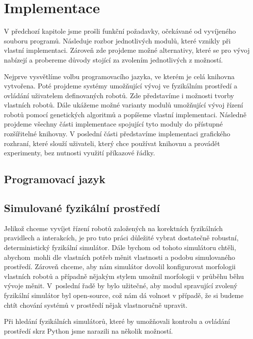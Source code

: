 
\chapter{Implementace}
V předchozí kapitole jsme prošli funkční požadavky, očekávané od vyvíjeného
souboru programů. Následuje rozbor jednotlivých modulů, které vznikly při
vlastní implementaci. Zároveň zde projdeme možné alternativy, které se pro
vývoj nabízejí a probereme důvody stojící za zvolením jednotlivých z možností.

Nejprve vysvětlíme volbu programovacího jazyka, ve kterém je celá knihovna
vytvořena. Poté projdeme systémy umožňující vývoj ve fyzikálním prostředí a
ovládání uživatelem definovaných robotů. Zde představíme i možnosti tvorby
vlastních robotů. Dále ukážeme možné varianty modulů umožňující vývoj řízení
robotů pomocí genetických algoritmů a popíšeme vlastní implementaci. Následně
projdeme všechny části implementace spojující tyto moduly do přístupné
rozšířitelné knihovny. V poslední části představíme implementaci grafického
rozhraní, které slouží uživateli, který chce používat knihovnu a provádět
experimenty, bez nutnosti využití příkazové řádky.

\section{Programovací jazyk}


\section{Simulované fyzikální prostředí}

Jelikož chceme vyvíjet řízení robotů založených na korektních fyzikálních
pravidlech a interakcích, je pro tuto práci důležité vybrat dostatečně
robustní, deterministický fyzikální simulátor. Dále bychom od tohoto simulátoru
chtěli, abychom~mohli dle vlastních potřeb měnit vlastnosti a podobu simulovaného
prostředí. Zároveň chceme, aby nám simulátor dovolil konfigurovat morfologii
vlastních robotů a případně nějakým stylem umožnil morfologii v průběhu běhu
vývoje měnit. V~poslední řadě by bylo užitečné, aby modul spravující zvolený
fyzikální simulátor byl open-source, což nám dá volnost v případě, že si budeme
chtít chování systémů v prostředí nějak vlastnoručně upravit.

Při hledání fyzikálních simulátorů, které by umožňovali kontrolu a ovládání
prostředí skrz Python jsme narazili na několik možností.

